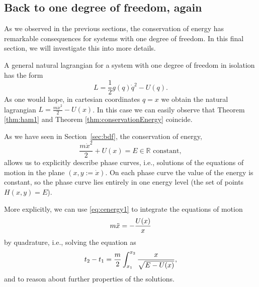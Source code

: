 \documentclass[english,fontsize=11pt,paper=a5,oneside]{scrbook}
\newcommand{\R}{\mathbb{R}}
\let\d\relax
\newcommand{\d}{\mathrm{d}}
\theoremstyle{definition}
\begin{document}


\subsection{Back to one degree of freedom, again}\label{sec:1deg-again}

As we observed in the previous sections, the conservation of energy has remarkable consequences for systems with one degree of freedom.
In this final section, we will investigate this into more details.

A general natural lagrangian for a system with one degree of freedom in isolation has the form
\begin{equation}
  L = \frac12 g(q)\dot q^2 - U(q).
\end{equation}
As one would hope, in cartesian coordinates $q = x$ we obtain the natural lagrangian $L = \frac{m \dot x^2}{2} - U(x)$.
In this case we can easily observe that Theorem \ref{thm:ham1} and Theorem \ref{thm:conservationEnergy} coincide.

As we have seen in Section~\ref{sec:bdf}, the conservation of energy,
\begin{equation}\label{eq:cenergy1}
  \frac{m \dot x^2}{2} + U(x) = E \in\R \mbox{ constant},
\end{equation}
allows us to explicitly describe phase curves, i.e., solutions of the equations of motion in the plane $(x, y := \dot x)$.
On each phase curve the value of the energy is constant, so the phase curve lies entirely in one energy level (the set of points $H(x,y)=E$).

More explicitly, we can use \eqref{eq:cenergy1} to integrate the equations of motion
\begin{equation}
  m \ddot x = - \frac{\d U(x)}{\d x}
\end{equation}
by quadrature, i.e., solving the equation as
\begin{equation}
  t_2 - t_1 = \frac m2 \int_{x_1}^{x_2} \frac{\d x}{\sqrt{E-U(x)}},
\end{equation}
and to reason about further properties of the solutions.
\end{document}
